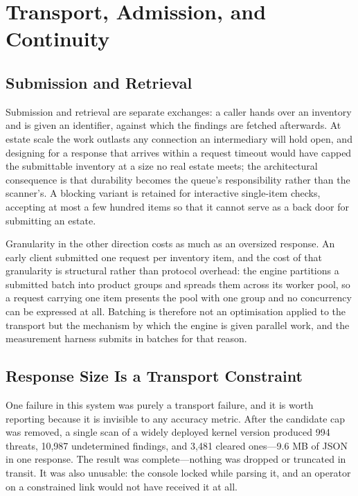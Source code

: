 \documentclass[fleqn,10pt,lineno]{wlpeerj}
\begin{document}
\section{Transport, Admission, and Continuity}
\label{sec:transport}

\subsection{Submission and Retrieval}
Submission and retrieval are separate exchanges: a caller hands over an inventory and is given an identifier, against which the findings are fetched afterwards. At estate scale the work outlasts any connection an intermediary will hold open, and designing for a response that arrives within a request timeout would have capped the submittable inventory at a size no real estate meets; the architectural consequence is that durability becomes the queue's responsibility rather than the scanner's. A blocking variant is retained for interactive single-item checks, accepting at most a few hundred items so that it cannot serve as a back door for submitting an estate.

Granularity in the other direction costs as much as an oversized response. An early client submitted one request per inventory item, and the cost of that granularity is structural rather than protocol overhead: the engine partitions a submitted batch into product groups and spreads them across its worker pool, so a request carrying one item presents the pool with one group and no concurrency can be expressed at all. Batching is therefore not an optimisation applied to the transport but the mechanism by which the engine is given parallel work, and the measurement harness submits in batches for that reason.

\subsection{Response Size Is a Transport Constraint}
One failure in this system was purely a transport failure, and it is worth reporting because it is invisible to any accuracy metric. After the candidate cap was removed, a single scan of a widely deployed kernel version produced 994 threats, 10,987 undetermined findings, and 3,481 cleared ones---9.6 MB of JSON in one response. The result was complete---nothing was dropped or truncated in transit. It was also unusable: the console locked while parsing it, and an operator on a constrained link would not have received it at all.
\end{document}

